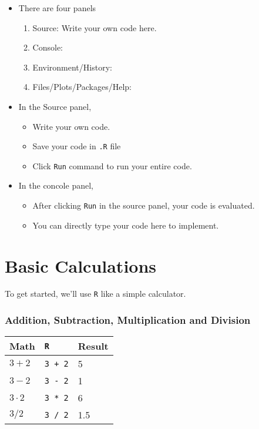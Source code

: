 \documentclass[]{book}
\providecommand{\tightlist}{%
  \setlength{\itemsep}{0pt}\setlength{\parskip}{0pt}}
\begin{document}
\begin{itemize}
\tightlist
\item
  There are four panels

  \begin{enumerate}
  \def\labelenumi{\arabic{enumi}.}
  \tightlist
  \item
    Source: Write your own code here.
  \item
    Console:
  \item
    Environment/History:
  \item
    Files/Plots/Packages/Help:
  \end{enumerate}
\item
  In the Source panel,

  \begin{itemize}
  \tightlist
  \item
    Write your own code.
  \item
    Save your code in \texttt{.R} file
  \item
    Click \texttt{Run} command to run your entire code.
  \end{itemize}
\item
  In the concole panel,

  \begin{itemize}
  \tightlist
  \item
    After clicking \texttt{Run} in the source panel, your code is evaluated.
  \item
    You can directly type your code here to implement.
  \end{itemize}
\end{itemize}

\hypertarget{basic-calculations}{%
\section{Basic Calculations}\label{basic-calculations}}

To get started, we'll use \texttt{R} like a simple calculator.

\hypertarget{addition-subtraction-multiplication-and-division}{%
\subsubsection*{Addition, Subtraction, Multiplication and Division}\label{addition-subtraction-multiplication-and-division}}

\begin{longtable}[]{@{}lll@{}}
\toprule
Math & \texttt{R} & Result\tabularnewline
\midrule
\endhead
\(3 + 2\) & \texttt{3\ +\ 2} & 5\tabularnewline
\(3 - 2\) & \texttt{3\ -\ 2} & 1\tabularnewline
\(3 \cdot2\) & \texttt{3\ *\ 2} & 6\tabularnewline
\(3 / 2\) & \texttt{3\ /\ 2} & 1.5\tabularnewline
\bottomrule
\end{longtable}
\end{document}
